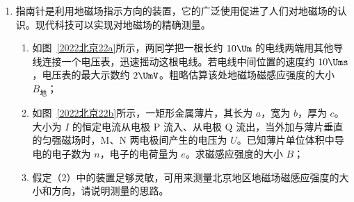 \documentclass[\gkver]{gaokaozhenti}
\begin{document}
\begin{enumerate}
{$F = \frac{4\pi^{2}km}{r^{2}}$

即恒星对行星的作用力 $F$ 与 $r$ 的平方成反比。

（3）假定恒星的能量辐射各向均匀，地球绕恒星做半径为 $r$ 的圆周运动，恒星单位时间内向外辐射的能量为 $P_{0}$。以恒星为球心，以 $r$ 为半径的球面上，单位面积单位时间接受到的辐射能量 $P = \frac{P_{0}}{4\pi r^{2}}$。设地球绕太阳公转半径为 $r_{1}$，在新轨道上公转半径为 $r_{2}$。地球在新公转轨道上的温度与“流浪”前一样，必须满足 $P$ 不变，由于恒星单位时间内向外辐射的能量是太阳的 16 倍，得 $r_{2} = 4r_{1}$。

设恒星质量为 $M$，地球在轨道上运行周期为 $T$，万有引力提供向心力，有

$\frac{GMm}{r^{2}} = mr\frac{4\pi^{2}}{T^{2}}$

解得

$T = \sqrt{\frac{4\pi^{2}r^{3}}{GM}}$

由于恒星质量是太阳质量的 2 倍，得 $\frac{T_{2}}{T_{1}} = 4\sqrt{2}$。
}

\item
指南针是利用地磁场指示方向的装置，它的广泛使用促进了人们对地磁场的认识。现代科技可以实现对地磁场的精确测量。
\begin{enumerate}
	\item
	如图~\ref{2022北京22a}所示，两同学把一根长约 $10\Um$ 的电线两端用其他导线连接一个电压表，迅速摇动这根电线。若电线中间位置的速度约 $10\Ums$，电压表的最大示数约 $2\UmV$。粗略估算该处地磁场磁感应强度的大小 $B_{\text{地}}$；
	\item
	如图~\ref{2022北京22b}所示，一矩形金属薄片，其长为 $a$，宽为 $b$，厚为 $c$。大小为 $I$ 的恒定电流从电极 P 流入、从电极 Q 流出，当外加与薄片垂直的匀强磁场时，M、N 两电极间产生的电压为 $U$。已知薄片单位体积中导电的电子数为 $n$，电子的电荷量为 $e$。求磁感应强度的大小 $B$；
	\item
	假定（2）中的装置足够灵敏，可用来测量北京地区地磁场磁感应强度的大小和方向，请说明测量的思路。
\end{enumerate}


\end{enumerate}
\end{document}
